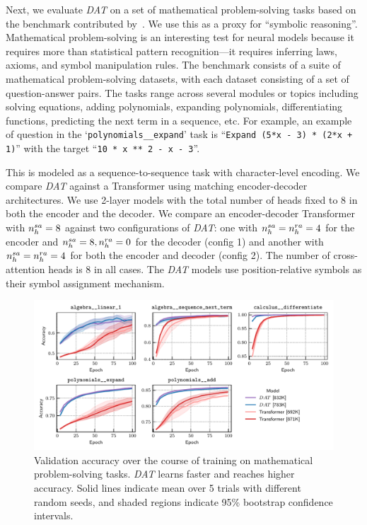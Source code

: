 Next, we evaluate \textit{DAT} on a set of mathematical problem-solving tasks based on the benchmark contributed by~\citet{saxtonAnalyzingMathematicalReasoning2019}. We use this as a proxy for ``symbolic reasoning''. Mathematical problem-solving is an interesting test for neural models because it requires more than statistical pattern recognition---it requires inferring laws, axioms, and symbol manipulation rules. The benchmark consists of a suite of mathematical problem-solving datasets, with each dataset consisting of a set of question-answer pairs. The tasks range across several modules or topics including solving equations, adding polynomials, expanding polynomials, differentiating functions, predicting the next term in a sequence, etc. For example, an example of question in the `\texttt{polynomials\_\_expand}' task is ``\texttt{Expand (5*x - 3) * (2*x + 1)}'' with the target ``\texttt{10 * x ** 2 - x - 3}''.

This is modeled as a sequence-to-sequence task with character-level encoding. We compare \textit{DAT} against a Transformer using matching encoder-decoder architectures. We use 2-layer models with the total number of heads fixed to $8$ in both the encoder and the decoder. We compare an encoder-decoder Transformer with $n_h^{sa} = 8$ against two configurations of \textit{DAT}: one with $n_h^{sa} = n_h^{ra} = 4$ for the encoder and $n_h^{sa} = 8, n_h^{ra} = 0$ for the decoder (config 1) and another with $n_h^{sa} = n_h^{ra} = 4$ for both the encoder and decoder (config 2). The number of cross-attention heads is $8$ in all cases. The \textit{DAT} models use position-relative symbols as their symbol assignment mechanism.

\begin{figure}
    \includegraphics[width=\textwidth]{figs/experiments/math/math_training_curves_interpolation.pdf}
    \caption{Validation accuracy over the course of training on mathematical problem-solving tasks. \textit{DAT} learns faster and reaches higher accuracy. Solid lines indicate mean over 5 trials with different random seeds, and shaded regions indicate 95\% bootstrap confidence intervals.}\label{fig:math_training_curves_interpolation}
\end{figure}

